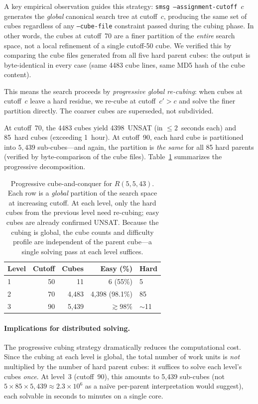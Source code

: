 \documentclass[11pt,a4paper]{article}
\theoremstyle{definition}
\theoremstyle{remark}
\begin{document}
A key empirical observation guides this strategy:
\texttt{smsg --assignment-cutoff}~$c$ generates the
\emph{global} canonical search tree at cutoff~$c$,
producing the same set of cubes regardless of any
\texttt{--cube-file} constraint passed during the cubing phase.
In other words, the cubes at cutoff~70 are a
finer partition of the \emph{entire} search space, not a
local refinement of a single cutoff-50 cube.
We verified this by comparing the cube files generated
from all five hard parent cubes: the output is
byte-identical in every case (same 4483 cube lines,
same MD5 hash of the cube content).

This means the search proceeds by \emph{progressive global
re-cubing}: when cubes at cutoff~$c$ leave a hard residue,
we re-cube at cutoff~$c' > c$ and solve the finer partition
directly.  The coarser cubes are superseded, not subdivided.

At cutoff~70, the 4483 cubes yield 4398~UNSAT
(in $\leq 2$~seconds each) and 85~hard cubes
(exceeding 1~hour).  At cutoff~90, each hard cube is
partitioned into $5{,}439$ sub-cubes---and again,
the partition is \emph{the same} for all 85 hard parents
(verified by byte-comparison of the cube files).
Table~\ref{tab:progressive-cubing} summarizes the
progressive decomposition.

\begin{table}[h]
\centering
\begin{tabular}{lrrrl}
\toprule
\textbf{Level} & \textbf{Cutoff} & \textbf{Cubes} & \textbf{Easy (\%)} & \textbf{Hard} \\
\midrule
1 & 50  & 11    & 6 (55\%) & 5 \\
2 & 70  & 4{,}483 & 4{,}398 (98.1\%) & 85 \\
3 & 90  & 5{,}439 & $\gtrsim 98\%$ & $\sim$11 \\
\bottomrule
\end{tabular}
\caption{Progressive cube-and-conquer for $R(5,5,43)$.
Each row is a \emph{global} partition of the search space
at increasing cutoff.  At each level, only the hard cubes
from the previous level need re-cubing; easy cubes are
already confirmed UNSAT.  Because the cubing is global,
the cube counts and difficulty profile are independent of
the parent cube---a single solving pass at each level suffices.}
\label{tab:progressive-cubing}
\end{table}

\paragraph{Implications for distributed solving.}
The progressive cubing strategy dramatically reduces the
computational cost.  Since the cubing at each level is global,
the total number of work units is \emph{not} multiplied by the
number of hard parent cubes: it suffices to solve
each level's cubes \emph{once}.  At level~3 (cutoff~90),
this amounts to 5{,}439 sub-cubes (not
$5 \times 85 \times 5{,}439 \approx 2.3 \times 10^6$
as a na\"ive per-parent interpretation would suggest),
each solvable in seconds to minutes on a single core.
\end{document}
